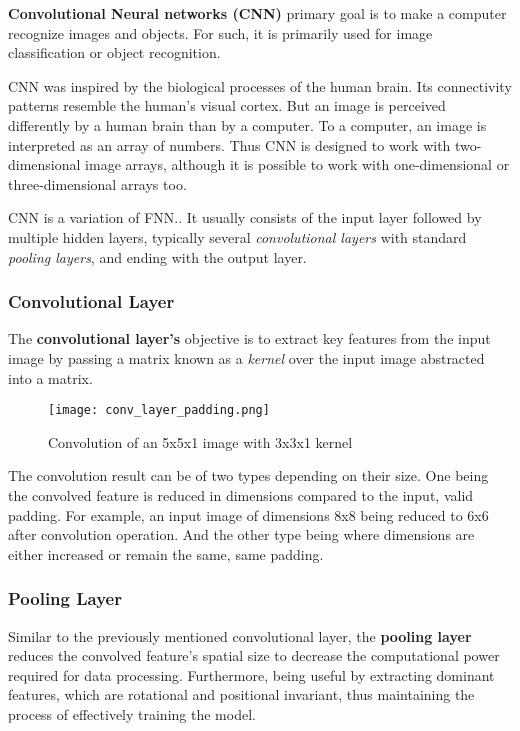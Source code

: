\textbf{Convolutional Neural networks (CNN)} primary goal is to make a computer recognize images and objects. For such, it is primarily used for image classification or object recognition.

CNN was inspired by the biological processes of the human brain. Its connectivity patterns resemble the human's visual cortex. But an image is perceived differently by a human brain than by a computer. To a computer, an image is interpreted as an array of numbers. Thus CNN is designed to work with two-dimensional image arrays, although it is possible to work with one-dimensional or three-dimensional arrays too.\cite{mlmastery}

CNN is a variation of FNN.\cite{Goodfellow-et-al-2016}. It usually consists of the input layer followed by multiple hidden layers, typically several \textit{convolutional layers} with standard \textit{pooling layers}, and ending with the output layer. 

\subsubsection{Convolutional Layer}

The \textbf{convolutional layer's} objective is to extract key features from the input image by passing a matrix known as a \textit{kernel} over the input image abstracted into a matrix.\cite{mathworkscnn}

\begin{figure}[h]
	\centering
    \texttt{[image: conv\_layer\_padding.png]}
	\caption{Convolution of an 5x5x1 image with 3x3x1 kernel \cite{compguideCnn}}
	\label{fig:cnn_conv}
\end{figure}


The convolution result can be of two types depending on their size. One being the convolved feature is reduced in dimensions compared to the input, valid padding. For example, an input image of dimensions 8x8 being reduced to 6x6 after convolution operation. And the other type being where dimensions are either increased or remain the same, same padding. \cite{compguideCnn}

\subsubsection{Pooling Layer}


Similar to the previously mentioned convolutional layer, the \textbf{pooling layer} reduces the convolved feature's spatial size to decrease the computational power required for data processing. Furthermore, being useful by extracting dominant features, which are rotational and positional invariant, thus maintaining the process of effectively training the model.\cite{compguideCnn}

